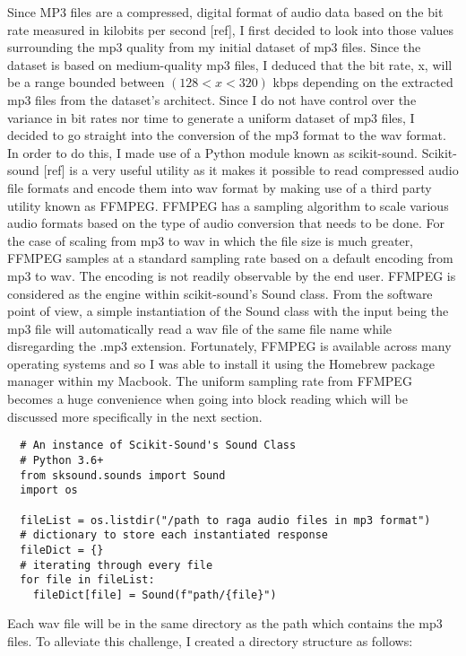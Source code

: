 Since MP3 files are a compressed, digital format of audio data based on the bit rate measured in kilobits per second [ref], I first decided to look into those values surrounding the mp3 quality from my initial dataset of mp3 files. Since the dataset is based on medium-quality mp3 files, I deduced that the bit rate, x, will be a range bounded between $ (128 < x < 320) $ kbps depending on the extracted mp3 files from the dataset's architect. Since I do not have control over the variance in bit rates nor time to generate a uniform dataset of mp3 files, I decided to go straight into the conversion of the mp3 format to the wav format. In order to do this, I made use of a Python module known as scikit-sound. Scikit-sound [ref] is a very useful utility as it makes it possible to read compressed audio file formats and encode them into wav format by making use of a third party utility known as FFMPEG. FFMPEG has a sampling algorithm to scale various audio formats based on the type of audio conversion that needs to be done. For the case of scaling from mp3 to wav in which the file size is much greater, FFMPEG samples at a standard sampling rate based on a default encoding from mp3 to wav. The encoding is not readily observable by the end user. FFMPEG is considered as the engine within scikit-sound's Sound class. From the software point of view, a simple instantiation of the Sound class with the input being the mp3 file will automatically read a wav file of the same file name while disregarding the .mp3 extension. Fortunately, FFMPEG is available across many operating systems and so I was able to install it using the Homebrew package manager within my Macbook. The uniform sampling rate from FFMPEG becomes a huge convenience when going into block reading which will be discussed more specifically in the next section.

\begin{lstlisting}
  # An instance of Scikit-Sound's Sound Class
  # Python 3.6+
  from sksound.sounds import Sound
  import os

  fileList = os.listdir("/path to raga audio files in mp3 format")
  # dictionary to store each instantiated response
  fileDict = {}
  # iterating through every file
  for file in fileList:
    fileDict[file] = Sound(f"path/{file}")
\end{lstlisting}

Each wav file will be in the same directory as the path which contains the mp3 files. To alleviate this challenge, I created a directory structure as follows:


